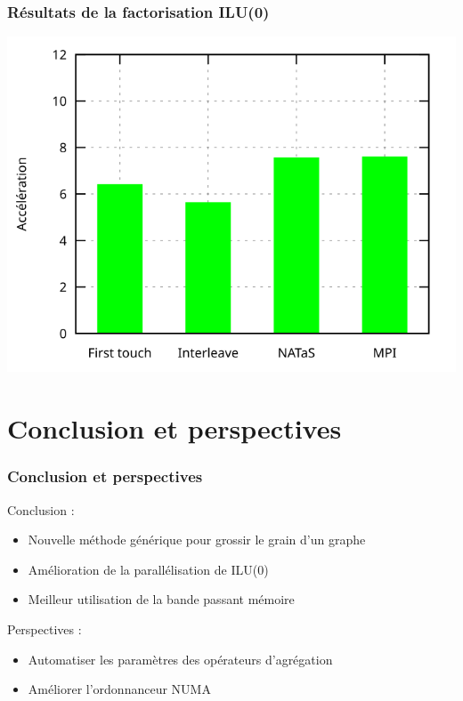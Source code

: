 \documentclass{beamer}
\begin{document}
\begin{frame}
  \frametitle{Résultats de la factorisation ILU(0)}

  \centerline{\includegraphics[width=0.8\linewidth]{res_ilu_nas}}

\end{frame}


\section{Conclusion et perspectives}
\begin{frame}
  \frametitle{Conclusion et perspectives}
         Conclusion :
    \begin{itemize}
      \item<1-> Nouvelle méthode générique pour grossir le grain d'un graphe
      \item<1-> Amélioration de la parallélisation de ILU(0)
      \item<1-> Meilleur utilisation de la bande passant mémoire
    \end{itemize}
    \pause

         \bigskip
         \bigskip

    Perspectives :
    \begin{itemize}
      \item<2-> Automatiser les paramètres des opérateurs d'agrégation
      \item<2-> Améliorer l'ordonnanceur NUMA
    \end{itemize}
\end{frame}
\end{document}
